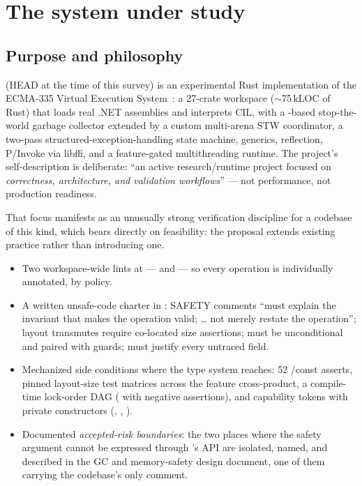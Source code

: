 \section{The system under study}
\label{sec:system}

\subsection{Purpose and philosophy}

\dotnetrs{} (HEAD  at the time of this survey) is an
experimental Rust implementation of the ECMA-335 Virtual Execution
System~\cite{ecma335}: a 27-crate workspace ($\sim$75\,kLOC of Rust) that
loads real .NET assemblies and interprets CIL, with a \gcarena{}-based
stop-the-world garbage collector extended by a custom multi-arena STW
coordinator, a two-pass structured-exception-handling state machine,
generics, reflection, P/Invoke via libffi, and a feature-gated
multithreading runtime. The project's self-description is deliberate:
``an active research/runtime project focused on \emph{correctness,
architecture, and validation workflows}'' --- not performance, not
production readiness.

That focus manifests as an unusually strong verification discipline
for a codebase of this kind, which bears directly on feasibility: the
proposal extends existing practice rather than introducing one.

\begin{itemize}[leftmargin=1.4em]
\item Two workspace-wide  lints at  ---
   and
   --- so every 
  operation is individually annotated, by policy.
\item A written unsafe-code charter in : SAFETY
  comments ``must explain the invariant that makes the operation valid;
  \dots{} not merely restate the operation''; layout transmutes require
  co-located size assertions;  must be
  unconditional and paired with  guards;
   must justify every untraced field.
\item Mechanized side conditions where the type system reaches: 52
  /const asserts, pinned layout-size test
  matrices across the feature cross-product, a compile-time lock-order
  DAG ( with negative 
  assertions), and capability tokens with private constructors
  (, ,
  ).
\item Documented \emph{accepted-risk boundaries}: the two places where the
  safety argument cannot be expressed through \gcarena{}'s API are
  isolated, named, and described in the GC and memory-safety design
  document, one of them carrying the codebase's only 
  comment.
\end{itemize}

